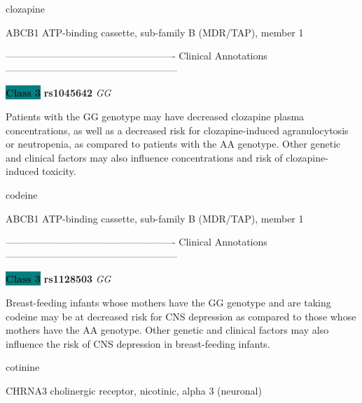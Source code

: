 \documentclass{resume} %
\begin{document}
\begin{rSection}{ clozapine }
\begin{rSubsection}{ ABCB1 }{ ATP-binding cassette, sub-family B (MDR/TAP), member 1 }{}{}
\item[] ---------------------------------------------------- Clinical Annotations -----------------------------------------------------\newline
\item \textbf{\colorbox{teal} {Class 3}} \textbf{ rs1045642 } \textit{ GG }
\item[] Patients with the GG genotype may have decreased clozapine plasma concentrations, as well as a decreased risk for clozapine-induced agranulocytosis or neutropenia, as compared to patients with the AA genotype. Other genetic and clinical factors may also influence concentrations and risk of clozapine-induced toxicity. 
\end{rSubsection}

\end{rSection}\begin{rSection}{ codeine }
\item[]

\begin{rSubsection}{ ABCB1 }{ ATP-binding cassette, sub-family B (MDR/TAP), member 1 }{}{}
\item[]

\item[] ---------------------------------------------------- Clinical Annotations -----------------------------------------------------\newline
\item \textbf{\colorbox{teal} {Class 3}} \textbf{ rs1128503 } \textit{ GG }
\item[] Breast-feeding infants whose mothers have the GG genotype and are taking codeine may be at decreased risk for CNS depression as compared to those whose mothers have the AA genotype. Other genetic and clinical factors may also influence the risk of CNS depression in breast-feeding infants. 
\end{rSubsection}

\end{rSection}\begin{rSection}{ cotinine }
\item[]

\begin{rSubsection}{ CHRNA3 }{ cholinergic receptor, nicotinic, alpha 3 (neuronal) }{}{}
\item[]


\end{rSubsection}
\end{rSection}
\end{document}
